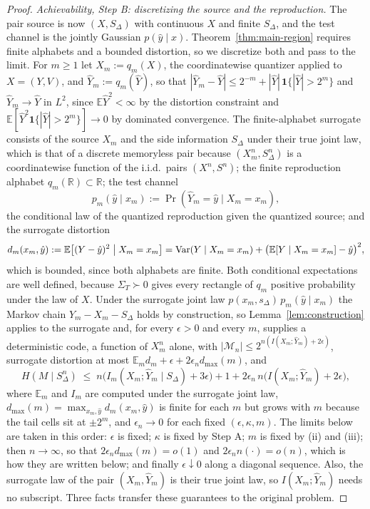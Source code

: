 \documentclass[11pt,onecolumn]{IEEEtran}
\newcommand{\E}{\mathbb{E}}
\newcommand{\R}{\mathbb{R}}
\newcommand{\hY}{\widehat{Y}}
\begin{document}
\begin{proof}
\emph{Achievability, Step B: discretizing the source and the
reproduction.} The pair source is now $(X,S_\Delta)$ with continuous
$X$ and finite $S_\Delta$, and the test channel is the jointly Gaussian
$p(\hat y\mid x)$. Theorem~\ref{thm:main-region} requires finite
alphabets and a bounded distortion, so we discretize both and pass to
the limit. For $m\ge1$ let $X_m:=q_m(X)$, the coordinatewise quantizer
applied to $X=(Y,V)$, and $\hY_m:=q_m(\hY)$, so that
$|\hY_m-\hY|\le2^{-m}+|\hY|\,\mathbf 1\{|\hY|>2^m\}$ and $\hY_m\to\hY$
in $L^2$, since $\E\hY^2<\infty$ by the distortion constraint and
$\E[\hY^2\mathbf 1\{|\hY|>2^m\}]\to0$ by dominated convergence. The
finite-alphabet surrogate consists of the source $X_m$
and the side information $S_\Delta$ under their true joint law, which
is that of a discrete memoryless pair because $(X_m^n,S_\Delta^n)$ is a
coordinatewise function of the i.i.d.\ pairs $(X^n,S^n)$; the finite
reproduction alphabet $q_m(\R)\subset\R$; the test channel
\[
p_m(\hat y\mid x_m):=\Pr(\hY_m=\hat y\mid X_m=x_m),
\]
the conditional law of the quantized reproduction given the quantized
source; and the surrogate distortion
\[
d_m(x_m,\hat y):=\E\bigl[(Y-\hat y)^2\bigm|X_m=x_m\bigr]
=\operatorname{Var}(Y\mid X_m=x_m)+\bigl(\E[Y\mid X_m=x_m]-\hat y\bigr)^2,
\]
which is bounded, since both alphabets are finite. Both conditional
expectations are well defined, because $\Sigma_T\succ0$ gives every
rectangle of $q_m$ positive probability under the law of $X$.
Under the surrogate joint law $p(x_m,s_\Delta)\,p_m(\hat y\mid x_m)$
the Markov chain $\hY_m-X_m-S_\Delta$ holds by construction, so
Lemma~\ref{lem:construction} applies to the surrogate and, for every
$\epsilon>0$ and every $m$, supplies a deterministic code, a function of
$X_m^n$ alone, with $|\mathcal M_n|\le2^{n(I(X_m;\hY_m)+2\epsilon)}$,
surrogate distortion at most $\E_md_m+\epsilon+2\epsilon_nd_{\max}(m)$,
and
\begin{equation}
H(M\mid S_\Delta^n)\;\le\;
n\bigl(I_m(X_m;\hY_m\mid S_\Delta)+3\epsilon\bigr)
+1+2\epsilon_n\,n\bigl(I(X_m;\hY_m)+2\epsilon\bigr),
\label{eq:quant-fano}
\end{equation}
where $\E_m$ and $I_m$ are computed under the surrogate joint law,
$d_{\max}(m)=\max_{x_m,\hat y}d_m(x_m,\hat y)$ is finite for each $m$
but grows with $m$ because the tail cells sit at $\pm2^m$, and
$\epsilon_n\to0$ for each fixed $(\epsilon,\kappa,m)$. The limits below are
taken in this order: $\epsilon$ is fixed; $\kappa$ is fixed by Step A; $m$ is
fixed by (ii) and (iii); then $n\to\infty$, so that
$2\epsilon_nd_{\max}(m)=o(1)$ and $2\epsilon_nn(\cdot)=o(n)$, which is
how they are written below; and finally $\epsilon\downarrow0$ along a
diagonal sequence. Also, the
surrogate law of the pair $(X_m,\hY_m)$ is their true joint law, so
$I(X_m;\hY_m)$ needs no subscript. Three facts transfer these
guarantees to the original problem.


\end{proof}
\end{document}
